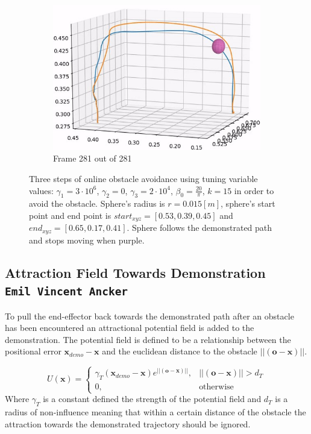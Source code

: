 \documentclass[../main.tex]{subfiles}
\begin{document}
\begin{figure}[H]
\begin{subfigure}[b]{0.32\textwidth}
        \includegraphics[width=\textwidth]{figures/online_obs/tuned_param/3D_tuned-281.jpg}
        \caption{Frame 281 out of 281}
    \end{subfigure}
    \caption{Three steps of online obstacle avoidance using tuning variable values: $\gamma_1 = 3\cdot10^6$,  $\gamma_2=0$, $\gamma_3=2\cdot10^4$, $\beta_0 = \frac{20}{\pi}$, $k=15$ in order to avoid the obstacle. Sphere's radius is $r=0.015[m]$, sphere's start point and end point is $start_{xyz}=[0.53, 0.39, 0.45]$ and $end_{xyz}=[0.65, 0.17, 0.41]$. Sphere follows the demonstrated path and stops moving when purple.}
    \label{fig:dmp:online:tuned}
\end{figure}

\subsection{Attraction Field Towards Demonstration \\ \normalfont\normalsize\texttt{Emil Vincent Ancker}}
To pull the end-effector back towards the demonstrated path after an obstacle has been encountered an attractional potential field is added to the demonstration. The potential field is defined to be a relationship between the positional error $\boldsymbol{x}_{demo} - \boldsymbol{x}$ and the euclidean distance to the obstacle $||(\boldsymbol{o} - \boldsymbol{x})||$.

\begin{equation} \label{eq:link:pot}
    U(\boldsymbol{x}) = \begin{cases}
      \gamma_T (\boldsymbol{x}_{demo} - \boldsymbol{x})e^{||(\boldsymbol{o} - \boldsymbol{x})||}, & ||(\boldsymbol{o} - \boldsymbol{x})|| > d_T \\
      0, & \text{otherwise}
    \end{cases}
\end{equation}
Where $\gamma_T$ is a constant defined the strength of the potential field and $d_T$ is a radius of non-influence meaning that within a certain distance of the obstacle the attraction towards the demonstrated trajectory should be ignored.
\end{document}
